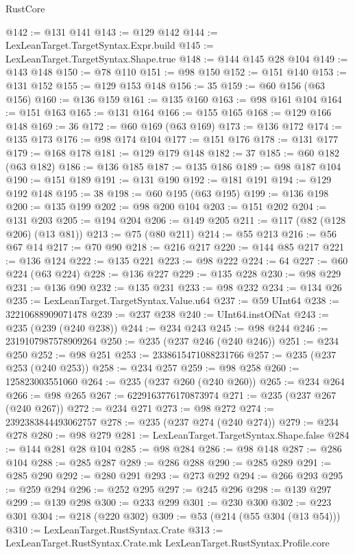\begin{lexlean}{RustCore}
\begin{coremodule}
@142 := @131 @141
@143 := @129 @142
@144 := LexLeanTarget.TargetSyntax.Expr.build
@145 := LexLeanTarget.TargetSyntax.Shape.true
@148 := @144 @145 @28 @104
@149 := @143 @148
@150 := @78 @110
@151 := @98 @150
@152 := @151 @140
@153 := @131 @152
@155 := @129 @153 @148
@156 := 35
@159 := @60 @156 (@63 @156)
@160 := @136 @159
@161 := @135 @160
@163 := @98 @161 @104
@164 := @151 @163
@165 := @131 @164
@166 := @155 @165
@168 := @129 @166 @148
@169 := 36
@172 := @60 @169 (@63 @169)
@173 := @136 @172
@174 := @135 @173
@176 := @98 @174 @104
@177 := @151 @176
@178 := @131 @177
@179 := @168 @178
@181 := @129 @179 @148
@182 := 37
@185 := @60 @182 (@63 @182)
@186 := @136 @185
@187 := @135 @186
@189 := @98 @187 @104
@190 := @151 @189
@191 := @131 @190
@192 := @181 @191
@194 := @129 @192 @148
@195 := 38
@198 := @60 @195 (@63 @195)
@199 := @136 @198
@200 := @135 @199
@202 := @98 @200 @104
@203 := @151 @202
@204 := @131 @203
@205 := @194 @204
@206 := @149 @205
@211 := @117 (@82 (@128 @206) (@13 @81))
@213 := @75 (@80 @211)
@214 := @55 @213
@216 := @56 @67 @14
@217 := @70 @90
@218 := @216 @217
@220 := @144 @85 @217
@221 := @136 @124
@222 := @135 @221
@223 := @98 @222
@224 := 64
@227 := @60 @224 (@63 @224)
@228 := @136 @227
@229 := @135 @228
@230 := @98 @229
@231 := @136 @90
@232 := @135 @231
@233 := @98 @232
@234 := @134 @26
@235 := LexLeanTarget.TargetSyntax.Value.u64
@237 := @59 UInt64
@238 := 32210688909071478
@239 := @237 @238
@240 := UInt64.instOfNat
@243 := @235 (@239 (@240 @238))
@244 := @234 @243
@245 := @98 @244
@246 := 2319107987578909264
@250 := @235 (@237 @246 (@240 @246))
@251 := @234 @250
@252 := @98 @251
@253 := 2338615471088231766
@257 := @235 (@237 @253 (@240 @253))
@258 := @234 @257
@259 := @98 @258
@260 := 125823003551060
@264 := @235 (@237 @260 (@240 @260))
@265 := @234 @264
@266 := @98 @265
@267 := 6229163776170873974
@271 := @235 (@237 @267 (@240 @267))
@272 := @234 @271
@273 := @98 @272
@274 := 2392383844493062757
@278 := @235 (@237 @274 (@240 @274))
@279 := @234 @278
@280 := @98 @279
@281 := LexLeanTarget.TargetSyntax.Shape.false
@284 := @144 @281 @28 @104
@285 := @98 @284
@286 := @98 @148
@287 := @286 @104
@288 := @285 @287
@289 := @286 @288
@290 := @285 @289
@291 := @285 @290
@292 := @280 @291
@293 := @273 @292
@294 := @266 @293
@295 := @259 @294
@296 := @252 @295
@297 := @245 @296
@298 := @139 @297
@299 := @139 @298
@300 := @233 @299
@301 := @230 @300
@302 := @223 @301
@304 := @218 (@220 @302)
@309 := @53 (@214 (@55 @304 (@13 @54)))
@310 := LexLeanTarget.RustSyntax.Crate
@313 := LexLeanTarget.RustSyntax.Crate.mk LexLeanTarget.RustSyntax.Profile.core

\end{coremodule}
\end{lexlean}
